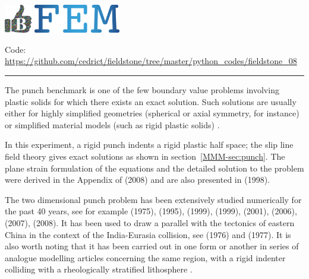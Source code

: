 \includegraphics[height=1.25cm]{images/pictograms/benchmark}
\includegraphics[height=1.25cm]{images/pictograms/FEM}




\begin{center}
\inpython
{\small Code: \url{https://github.com/cedrict/fieldstone/tree/master/python_codes/fieldstone_08}}
\end{center}

\par\noindent\rule{\textwidth}{0.4pt}

The punch benchmark is one of the few boundary value problems involving plastic solids for 
which there exists an exact solution. 
Such solutions are usually either for highly simplified geometries (spherical or axial 
symmetry, for instance) or simplified material models (such as rigid plastic solids) \cite{kacha04}.

In this experiment, a rigid punch indents a rigid plastic half space; the slip line field theory gives 
exact solutions as shown in section~\ref{MMM-sec:punch}. 
The plane strain formulation of the equations and the detailed solution to the 
problem were derived in the Appendix of \textcite{thfb08} (2008) and are also presented in 
\textcite{gepd98} (1998).

The two dimensional punch problem has been extensively studied numerically for the past 40 years,
see for example
\textcite{zihl75} (1975),
\textcite{zihp95} (1995),
\textcite{chan99} (1999),
\textcite{huhy99} (1999),
\textcite{chpe01} (2001),
\textcite{yuti06} (2006),
\textcite{raab07} (2007),
\textcite{bufs08} (2008).
It has been used to draw a parallel 
with the tectonics of eastern China in the context of the 
India-Eurasia collision, see \textcite{tamo76} (1976) and \textcite{mota77} (1977).
It is also worth noting that it has been carried out in one form or another in series of 
analogue modelling articles 
concerning the same region, with a rigid indenter colliding with a rheologically stratified 
lithosphere \cite{peta88,daco88,jodc90}.
 

